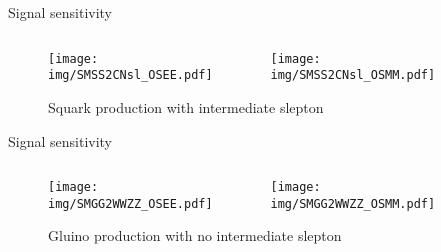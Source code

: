 \documentclass{beamer}
\begin{document}
\begin{frame}{Signal sensitivity}
  \begin{figure}\begin{columns}
    \begin{column}{0.5\textwidth}
      \texttt{[image: img/SMSS2CNsl\_OSEE.pdf]}
    \end{column}
    \begin{column}{0.5\textwidth}
      \texttt{[image: img/SMSS2CNsl\_OSMM.pdf]}
    \end{column}
  \end{columns}
    \caption{Squark production with intermediate slepton}
  \end{figure}
\end{frame}

\begin{frame}{Signal sensitivity}
  \begin{figure}\begin{columns}
    \begin{column}{0.5\textwidth}
      \texttt{[image: img/SMGG2WWZZ\_OSEE.pdf]}
    \end{column}
    \begin{column}{0.5\textwidth}
      \texttt{[image: img/SMGG2WWZZ\_OSMM.pdf]}
    \end{column}
  \end{columns}
    \caption{Gluino production with no intermediate slepton}
  \end{figure}
\end{frame}

\end{document}
